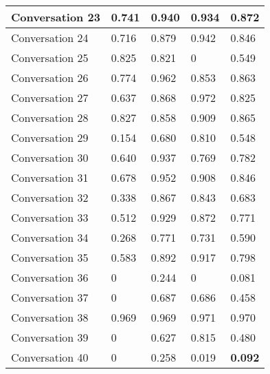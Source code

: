 \begin{table}[]
\begin{tabular}{|l|l|l|l|l|}
Conversation 23  & 0.741    & 0.940 & 0.934       & 0.872   \\ \hline
Conversation 24  & 0.716    & 0.879 & 0.942       & 0.846   \\ \hline
Conversation 25  & 0.825    & 0.821 & 0           & 0.549   \\ \hline
Conversation 26  & 0.774    & 0.962 & 0.853       & 0.863   \\ \hline
Conversation 27  & 0.637    & 0.868 & 0.972       & 0.825   \\ \hline
Conversation 28  & 0.827    & 0.858 & 0.909       & 0.865   \\ \hline
Conversation 29  & 0.154    & 0.680 & 0.810       & 0.548   \\ \hline
Conversation 30  & 0.640    & 0.937 & 0.769       & 0.782   \\ \hline
Conversation 31  & 0.678    & 0.952 & 0.908       & 0.846   \\ \hline
Conversation 32  & 0.338    & 0.867 & 0.843       & 0.683   \\ \hline
Conversation 33  & 0.512    & 0.929 & 0.872       & 0.771   \\ \hline
Conversation 34  & 0.268    & 0.771 & 0.731       & 0.590   \\ \hline
Conversation 35  & 0.583    & 0.892 & 0.917       & 0.798   \\ \hline
Conversation 36  & 0        & 0.244 & 0           & 0.081   \\ \hline
Conversation 37  & 0        & 0.687 & 0.686       & 0.458   \\ \hline
Conversation 38  & 0.969    & 0.969 & 0.971       & 0.970   \\ \hline
Conversation 39  & 0        & 0.627 & 0.815       & 0.480   \\ \hline
Conversation 40  & 0        & 0.258 & 0.019       & \textbf{0.092}   \\ \hline

\end{tabular}
\end{table}
